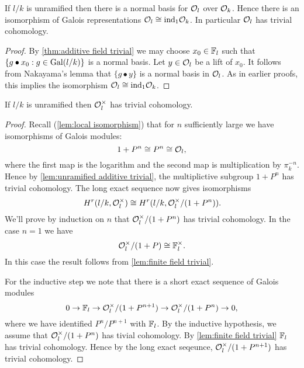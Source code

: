 \begin{lemma} \label{lem:unramified additive trivial}
	If $l/k$ is unramified then there is a normal basis for ${\mathcal O}_l$ over ${\mathcal O}_k$.
	Hence there is an isomorphism of Galois representations ${\mathcal O}_l \cong \mathrm{ind}_1 {\mathcal O}_k$.
	In particular ${\mathcal O}_l$ has trivial cohomology.
\end{lemma}

\begin{proof}
	By \ref{thm:additive field trivial}
	we may choose $x_0 \in {\mathbb F}_l$
	such that $\{g \bullet x_0 :g \in \mathrm{Gal}(l/k)\}$ is a normal basis.
	Let $y \in {\mathcal O}_l$ be a lift of $x_0$.
	It follows from Nakayama's lemma that $\{g \bullet y\}$ is a normal basis	in ${\mathcal O}_l$.
	As in earlier proofs, this implies the isomorphism ${\mathcal O}_l \cong \mathrm{ind}_1 {\mathcal O}_k$.
\end{proof}




\begin{lemma}	\label{lem:unramified units trivial}
	If $l/k$ is unramified then ${\mathcal O}_l^\times$ has trivial cohomology.
\end{lemma}

\begin{proof}
	Recall (\ref{lem:local isomorphism}) that for $n$ sufficiently large we have isomorphisms of
	Galois modules:
	\[
		1 + P^n \cong P^n \cong {\mathcal O}_l,
	\]
	where the first map is the logarithm and the second map is multiplication by $\pi_k^{-n}$.
	Hence by \ref{lem:unramified additive trivial}, the multiplictive subgroup $1+P^n$ has trivial
	cohomology.
	The long exact sequence now gives isomorphisms
	\[
		H^r(l/k,{\mathcal O}_l^\times) \cong H^r(l/k,{\mathcal O}_l^\times / (1+P^n)).
	\]
	We'll prove by induction on $n$ that ${\mathcal O}_l^\times / (1+P^n)$ has trivial cohomology.
	In the case $n = 1$ we have
	\[
		{\mathcal O}_l^\times / (1+P) \cong {\mathbb F}_l^\times.
	\]
	In this case the result follows from \ref{lem:finite field trivial}.

	For the inductive step we note that there is a short exact sequence of Galois modules
	\[
		0 \to {\mathbb F}_l \to  {\mathcal O}_l^\times / (1+P^{n+1})  \to{\mathcal O}_l^\times / (1+P^n)  \to  0,
	\]
	where we have identified $P^n / P^{n+1}$ with ${\mathbb F}_l$.
	By the inductive hypothesis, we assume that ${\mathcal O}_l^\times / (1+P^n)$ has tivial cohomology.
	By \ref{lem:finite field trivial} ${\mathbb F}_l$ has trivial cohomology.
	Hence by the long exact seqeunce, ${\mathcal O}_l^\times / (1+P^{n+1})$ has trivial cohomology.
\end{proof}



